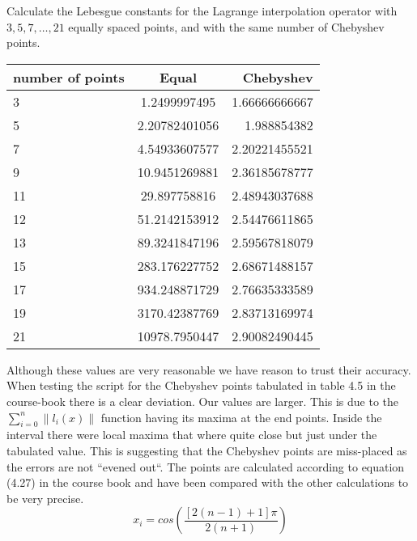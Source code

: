 \begin{problem}
Calculate the Lebesgue constants for the Lagrange interpolation
operator with $3, 5, 7, \dots , 21$ equally spaced points, and with the
same number of Chebyshev points.
\end{problem}


\begin{solution}
\begin{tabular}{ l | c | r }
number of points & Equal & Chebyshev \\ \hline
3 & 1.2499997495 & 1.66666666667 \\
5 & 2.20782401056 & 1.988854382 \\
7 & 4.54933607577 & 2.20221455521 \\
9 & 10.9451269881 & 2.36185678777 \\
11 & 29.897758816 & 2.48943037688 \\
12 & 51.2142153912 & 2.54476611865 \\
13 & 89.3241847196 & 2.59567818079 \\
15 & 283.176227752 & 2.68671488157 \\
17 & 934.248871729 & 2.76635333589 \\
19 & 3170.42387769 & 2.83713169974 \\
21 & 10978.7950447 & 2.90082490445 \\
\end{tabular}

Although these values are very reasonable we have reason to trust
their accuracy. When testing the script for the Chebyshev points tabulated in
table 4.5 in the course-book there is a clear deviation. Our values are larger. This is
due to the $\sum_{i=0}^n \|l_i(x)\|$ function having its maxima at the
end points. Inside the interval there were local maxima that where
quite close but just under the tabulated value. This is suggesting
that the Chebyshev points are miss-placed as the errors are not
 ``evened out``. The points are calculated according to equation
(4.27) in the course book and have been compared with the other
calculations to be very precise. 
\begin{equation*}
  x_i = cos\left(\frac{[2(n - 1) +1]\pi}{2(n + 1)}\right)
\end{equation*}
\end{solution}

